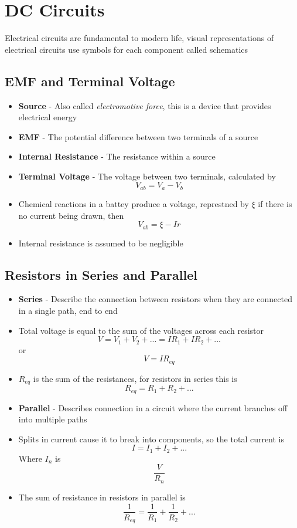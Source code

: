 \section{DC Circuits}
Electrical circuits are fundamental to modern life, visual representations of electrical circuits use symbols for each component called schematics

\subsection{EMF and Terminal Voltage}
\begin{itemize}
    \item \textbf{Source} - Also called \emph{electromotive force}, this is a device that provides electrical energy
    \item \textbf{EMF} - The potential difference between two terminals of a source
    \item \textbf{Internal Resistance} - The resistance within a source
    \item \textbf{Terminal Voltage} - The voltage between two terminals, calculated by \[V_{ab}=V_a-V_b\]
    \item Chemical reactions in a battey produce a voltage, represtned by \(\xi\) if there is no current being drawn, then \[V_{ab}=\xi-Ir\]
    \item Internal resistance is assumed to be negligible
\end{itemize}

\subsection{Resistors in Series and Parallel}
\begin{itemize}
    \item \textbf{Series} - Describe the connection between resistors when they are connected in a single path, end to end
    \item Total voltage is equal to the sum of the voltages across each resistor \[V=V_1+V_2+...=IR_1+IR_2+...\] or \[V=IR_{eq}\] 
    \item \(R_{eq}\) is the sum of the resistances, for resistors in series this is \[R_{eq}=R_1+R_2+...\]
    \item \textbf{Parallel} - Describes connection in a circuit where the current branches off into multiple paths
    \item Splits in current cause it to break into components, so the total current is \[I=I_1+I_2+...\] Where \(I_n\) is \[\frac{V}{R_n}\]
    \item The sum of resistance in resistors in parallel is \[\frac{1}{R_{eq}}=\frac{1}{R_1}+\frac{1}{R_2}+...\]
\end{itemize}

